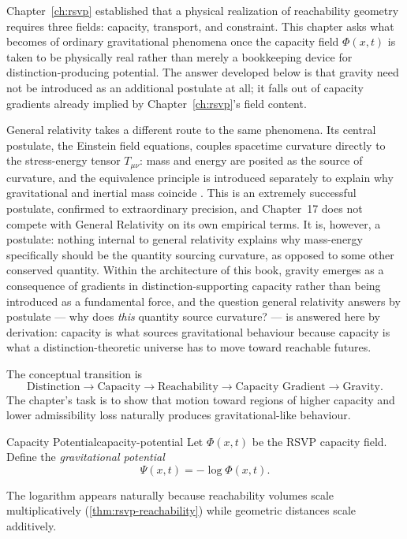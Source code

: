 \documentclass[12pt,twoside,openright]{book}
\begin{document}
Chapter~\ref{ch:rsvp} established that a physical realization
of reachability geometry requires three fields: capacity,
transport, and constraint. This chapter asks what becomes of
ordinary gravitational phenomena once the capacity field
$\Phi(x,t)$ is taken to be physically real rather than merely
a bookkeeping device for distinction-producing potential. The
answer developed below is that gravity need not be introduced
as an additional postulate at all; it falls out of capacity
gradients already implied by Chapter~\ref{ch:rsvp}'s field
content.

General relativity takes a different route to the same
phenomena. Its central postulate, the Einstein field
equations, couples spacetime curvature directly to the
stress-energy tensor $T_{\mu\nu}$: mass and energy are
posited as the source of curvature, and the equivalence
principle is introduced separately to explain why
gravitational and inertial mass coincide
\parencite{misner1973}. This is an extremely successful
postulate, confirmed to extraordinary precision, and Chapter~17
does not compete with General Relativity on its own
empirical terms. It is, however, a postulate: nothing internal
to general relativity explains why mass-energy specifically
should be the quantity sourcing curvature, as opposed to some
other conserved quantity. Within the architecture of this
book, gravity emerges as a consequence of gradients in
distinction-supporting capacity rather than being introduced
as a fundamental force, and the question general relativity
answers by postulate --- why does \emph{this} quantity source
curvature? --- is answered here by derivation: capacity is
what sources gravitational behaviour because capacity is what
a distinction-theoretic universe has to move toward reachable
futures.

The conceptual transition is
\[
  \text{Distinction} \to \text{Capacity} \to \text{Reachability}
  \to \text{Capacity Gradient} \to \text{Gravity}.
\]
The chapter's task is to show that motion toward regions of
higher capacity and lower admissibility loss naturally
produces gravitational-like behaviour.

\begin{definition}{Capacity Potential}{capacity-potential}
  Let $\Phi(x,t)$ be the RSVP capacity field. Define the
  \emph{gravitational potential}
  \[
    \Psi(x,t) = -\log \Phi(x,t).
  \]
\end{definition}

The logarithm appears naturally because reachability
volumes scale multiplicatively (\cref{thm:rsvp-reachability})
while geometric distances scale additively.
\end{document}
